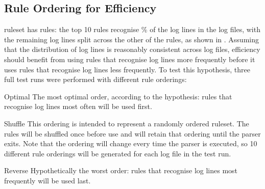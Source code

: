 

\FloatBarrier{}

\subsection{Rule Ordering for Efficiency}

\label{rule ordering for efficiency}

\parsernames{} ruleset has \numberOFrules{} rules: the top 10 rules
recognise \% of the log lines in the
\numberOFlogFILES{} log files, with the remaining log lines split across
the other \numberOFrulesMINUSten{} of the rules, as shown in .  Assuming that the distribution of log lines is reasonably
consistent across log files, \parsernames{} efficiency should benefit from
using rules that recognise log lines more frequently before it uses rules
that recognise log lines less frequently.  To test this hypothesis, three
full test runs were performed with different rule orderings:

\begin{boldeqlist}

    \item [Optimal]  The most optimal order, according to the hypothesis:
        rules that recognise log lines most often will be used first.

    \item [Shuffle] This ordering is intended to represent a randomly
        ordered ruleset.  The rules will be shuffled once before use and
        will retain that ordering until the parser exits.  Note that the
        ordering will change every time the parser is executed, so 10
        different rule orderings will be generated for each log file in the
        test run.

    \item [Reverse] Hypothetically the worst order: rules that recognise
        log lines most frequently will be used last.

\end{boldeqlist}

